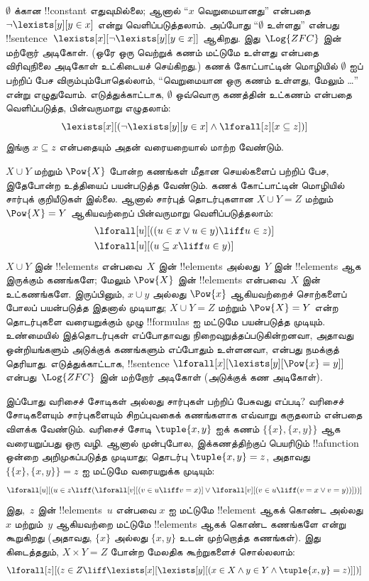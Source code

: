 \documentclass[../../../include/open-logic-section]{subfiles}
\begin{document}
$\emptyset$ க்கான !!{constant} எதுவுமில்லை; ஆனால் ``$x$ வெறுமையானது''
என்பதை $\lnot \lexists[y][y \in x]$ என்று வெளிப்படுத்தலாம். அப்போது
``$\emptyset$ உள்ளது'' என்பது !!{sentence}~$\lexists[x][\lnot
\lexists[y][y \in x]]$ ஆகிறது. இது~$\Log{ZFC}$ இன் மற்றோர் அடிகோள்.
(ஒரே ஒரு வெற்றுக் கணம் மட்டுமே உள்ளது என்பதை விரிவுநிலை அடிகோள்
உட்கிடையச் செய்கிறது.) கணக் கோட்பாட்டின் மொழியில் $\emptyset$ ஐப்
பற்றிப் பேச விரும்பும்போதெல்லாம், ``வெறுமையான ஒரு கணம் உள்ளது,
மேலும் \dots'' என்று எழுதுவோம். எடுத்துக்காட்டாக, $\emptyset$ ஒவ்வொரு
கணத்தின் உட்கணம் என்பதை வெளிப்படுத்த, பின்வருமாறு எழுதலாம்:
\[
\lexists[x][(\lnot\lexists[y][y \in x] \land \lforall[z][x \subseteq
    z])]
\]
இங்கு $x \subseteq z$ என்பதையும் அதன் வரையறையால் மாற்ற வேண்டும்.

$X \cup Y$ மற்றும் $\Pow{X}$ போன்ற கணங்கள் மீதான செயல்களைப் பற்றிப்
பேச, இதேபோன்ற உத்தியைப் பயன்படுத்த வேண்டும். கணக் கோட்பாட்டின் மொழியில்
சார்புக் குறியீடுகள் இல்லை. ஆனால் சார்புத் தொடர்புகளான $X \cup Y = Z$
மற்றும் $\Pow{X} = Y$ ஆகியவற்றைப் பின்வருமாறு வெளிப்படுத்தலாம்:
\begin{align*}
& \lforall[u][((u \in x \lor u \in y) \liff u \in z)]\\
& \lforall[u][(u \subseteq x \liff u \in y )]
\end{align*}
$X \cup Y$ இன் !!{element}s என்பவை~$X$ இன் !!{element}s அல்லது~$Y$ இன்
!!{element}s ஆக இருக்கும் கணங்களே; மேலும் $\Pow{X}$ இன் !!{element}s
என்பவை~$X$ இன் உட்கணங்களே. இருப்பினும், $x \cup y$ அல்லது $\Pow{x}$
ஆகியவற்றைச் சொற்களைப் போலப் பயன்படுத்த இதனால் முடியாது; $X \cup Y = Z$
மற்றும் $\Pow{X} = Y$ என்ற தொடர்புகளை வரையறுக்கும் முழு !!{formula}s
ஐ மட்டுமே பயன்படுத்த முடியும். உண்மையில் இத்தொடர்புகள் எப்போதாவது
நிறைவுறுத்தப்படுகின்றனவா, அதாவது ஒன்றியங்களும் அடுக்குக் கணங்களும்
எப்போதும் உள்ளனவா, என்பது நமக்குத் தெரியாது. எடுத்துக்காட்டாக,
!!{sentence} $\lforall[x][\lexists[y][\Pow{x} = y]]$ என்பது~$\Log{ZFC}$
இன் மற்றோர் அடிகோள் (அடுக்குக் கண அடிகோள்).

இப்போது வரிசைச் சோடிகள் அல்லது சார்புகள் பற்றிப் பேசுவது எப்படி?
வரிசைச் சோடிகளையும் சார்புகளையும் சிறப்புவகைக் கணங்களாக எவ்வாறு
கருதலாம் என்பதை விளக்க வேண்டும். வரிசைச் சோடி $\tuple{x, y}$ ஐக்
கணம் $\{\{x\}, \{x, y\}\}$ ஆக வரையறுப்பது ஒரு வழி. ஆனால் முன்புபோல,
இக்கணத்திற்குப் பெயரிடும் !!a{function} ஒன்றை அறிமுகப்படுத்த முடியாது;
தொடர்பு $\tuple{x, y} = z$, அதாவது $\{\{x\}, \{x, y\}\} = z$ ஐ மட்டுமே
வரையறுக்க முடியும்:
\[
\lforall[u][(u \in z \liff (\lforall[v][(v \in u \liff v = x)] \lor
  \lforall[v][(v \in u \liff (v = x \lor v = y))]))]
\]
இது,~$z$ இன் !!{element}s~$u$ என்பவை $x$ ஐ மட்டுமே !!{element} ஆகக்
கொண்ட அல்லது $x$ மற்றும்~$y$ ஆகியவற்றை மட்டுமே !!{element}s ஆகக் கொண்ட
கணங்களே என்று கூறுகிறது (அதாவது, $\{x\}$ அல்லது $\{x, y\}$ உடன்
முற்றொத்த கணங்கள்). இது கிடைத்ததும், $X \times Y = Z$ போன்ற மேலதிக
கூற்றுகளைச் சொல்லலாம்:
\[
\lforall[z][(z \in Z \liff \lexists[x][\lexists[y][(x \in
        X \land y \in Y \land \tuple{x, y} = z)]])]
\]
\end{document}
